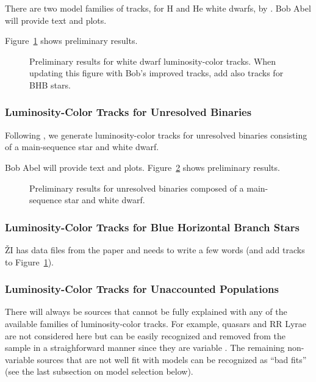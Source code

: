 There are two model families of tracks, for H and He white dwarfs, by \cite{1995PASP..107.1047B}.
Bob Abel will provide text and plots.

Figure~\ref{fig:locusWDs} shows preliminary results.


\begin{figure}[ht!]
\caption{Preliminary results for white dwarf luminosity-color
  tracks. When updating this figure with Bob's improved tracks, add also tracks for BHB stars. }
\label{fig:locusWDs}
\end{figure}


\subsubsection{Luminosity-Color Tracks for Unresolved Binaries}

Following \cite{2004ApJ...615L.141S}, we generate luminosity-color tracks for unresolved binaries
consisting of a main-sequence star and white dwarf.

Bob Abel will provide text and plots. Figure~\ref{fig:locusBinaries}
shows preliminary results. 

\begin{figure}[ht!]
\caption{Preliminary results for unresolved binaries composed of a main-sequence star and white dwarf.}
\label{fig:locusBinaries}
\end{figure}



\subsubsection{Luminosity-Color Tracks for Blue Horizontal Branch Stars}

\v{Z}I has data files from the \cite{2004AJ....127..899S} paper and needs to write a few words
(and add tracks to Figure~\ref{fig:locusWDs}). 




\subsubsection{Luminosity-Color Tracks for Unaccounted Populations}

There will always be sources that cannot be fully explained with any of the available families of
luminosity-color tracks. For example, quasars and RR Lyrae are not considered here
but can be easily recognized and removed from the sample in a straighforward manner since
they are variable \citep[e.g., see][]{2007AJ....134.2236S}. The remaining non-variable sources
that are not well fit with models can be recognized as ``bad fits'' (see the last subsection on
model selection below). 

